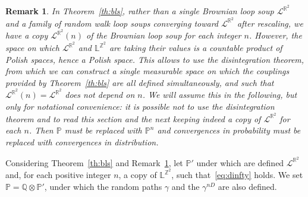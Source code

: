 \documentclass[11pt]{article}
\newtheorem{remark}[theorem]{Remark}
\begin{document}
\begin{remark}
  \label{rem:dis}
    In Theorem~\ref{th:bls}, rather than a single Brownian loop soup $\mathcal{L}^{\mathbb{R}^2}$ and a family of random walk loop soups converging toward $\mathcal{L}^{\mathbb{R}^2}$ after rescaling,
    we have a copy $\mathcal{L}^{\mathbb{R}^2}(n)$ of the Brownian loop soup for each integer $n$. However, the space on which $\mathcal{L}^{\mathbb{R}^2}$ and $\mathbb{L}^{\mathbb{Z}^2}$ are taking their values is a countable product of Polish spaces, hence a Polish space. This allows to use the disintegration theorem, from which we can construct a single measurable space on which the couplings provided by Theorem~\ref{th:bls} are all defined simultaneously, and such that $\mathcal{L}^{\mathbb{R}^2}(n)=\mathcal{L}^{\mathbb{R}^2}$ does not depend on $n$. We will assume this in the following, but only for notational convenience: it is possible not to use the disintegration theorem and to read this section and the next keeping indeed a copy of $\mathcal{L}^{\mathbb{R}^2}$ for each $n$. Then $\mathbb{P}$ must be replaced with $\mathbb{P}^n$ and convergences in probability must be replaced with convergences in distribution.
\end{remark}

Considering Theorem~\ref{th:bls} and Remark~\ref{rem:dis}, let $\mathbb{P}'$ under which are defined $\mathcal{L}^{\mathbb{R}^2}$ and, for each positive integer $n$, a copy of $\mathbb{L}^{\mathbb{Z}^2}$, such that~\eqref{eq:dinfty} holds. We set $\mathbb{P}=\mathbb{Q}\otimes \mathbb{P}'$,
 under which the random paths $\gamma$ and the $\gamma^{nD}$ are also defined.

\end{document}
